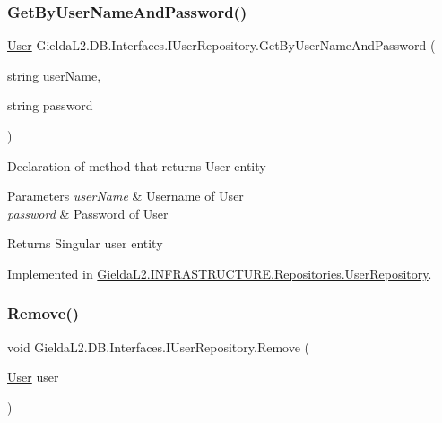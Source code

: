 \subsubsection{\texorpdfstring{GetByUserNameAndPassword()}{GetByUserNameAndPassword()}}
{\footnotesize\ttfamily \mbox{\hyperlink{class_gielda_l2_1_1_d_b_1_1_entities_1_1_user}{User}} Gielda\+L2.\+D\+B.\+Interfaces.\+I\+User\+Repository.\+Get\+By\+User\+Name\+And\+Password (\begin{DoxyParamCaption}\item[{string}]{user\+Name,  }\item[{string}]{password }\end{DoxyParamCaption})}



Declaration of method that returns User entity 


\begin{DoxyParams}{Parameters}
{\em user\+Name} & Username of User\\
\hline
{\em password} & Password of User\\
\hline
\end{DoxyParams}
\begin{DoxyReturn}{Returns}
Singular user entity
\end{DoxyReturn}


Implemented in \mbox{\hyperlink{class_gielda_l2_1_1_i_n_f_r_a_s_t_r_u_c_t_u_r_e_1_1_repositories_1_1_user_repository_a6ddb02c156ab0944804a41a5a9531482}{Gielda\+L2.\+I\+N\+F\+R\+A\+S\+T\+R\+U\+C\+T\+U\+R\+E.\+Repositories.\+User\+Repository}}.

\mbox{\label{interface_gielda_l2_1_1_d_b_1_1_interfaces_1_1_i_user_repository_ad353a86a583d55065532459823c413f2}} 
\subsubsection{\texorpdfstring{Remove()}{Remove()}}
{\footnotesize\ttfamily void Gielda\+L2.\+D\+B.\+Interfaces.\+I\+User\+Repository.\+Remove (\begin{DoxyParamCaption}\item[{\mbox{\hyperlink{class_gielda_l2_1_1_d_b_1_1_entities_1_1_user}{User}}}]{user }\end{DoxyParamCaption})}



